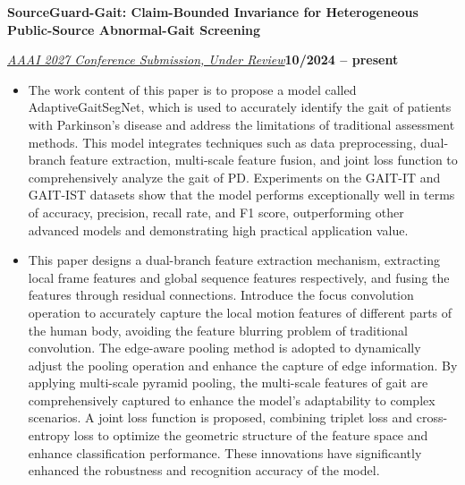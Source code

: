 \documentclass[10pt,a4paper]{article}
\newcommand{\titleline}[1]{\par\noindent\textbf{#1}\par}
\newcommand{\venueline}[2]{\par\noindent\uline{\textit{#1}}\hfill\textbf{#2}\par}
\newenvironment{cvitems}{%
  \begin{itemize}[leftmargin=14.20bp,labelwidth=4.20bp,labelsep=10.00bp,align=left,
    topsep=0bp,itemsep=0bp,parsep=0bp,partopsep=0bp,label={\textbullet}]
}{\end{itemize}}
\begin{document}
\titleline{SourceGuard-Gait: Claim-Bounded Invariance for Heterogeneous Public-Source Abnormal-Gait Screening}
\venueline{AAAI 2027 Conference Submission, Under Review}{10/2024 -- present}
\begin{cvitems}
\item The work content of this paper is to propose a model called AdaptiveGaitSegNet, which is used to accurately identify the gait of patients with Parkinson's disease and address the limitations of traditional assessment methods. This model integrates techniques such as data preprocessing, dual-branch feature extraction, multi-scale feature fusion, and joint loss function to comprehensively analyze the gait of PD. Experiments on the GAIT-IT and GAIT-IST datasets show that the model performs exceptionally well in terms of accuracy, precision, recall rate, and F1 score, outperforming other advanced models and demonstrating high practical application value.
\item This paper designs a dual-branch feature extraction mechanism, extracting local frame features and global sequence features respectively, and fusing the features through residual connections. Introduce the focus convolution operation to accurately capture the local motion features of different parts of the human body, avoiding the feature blurring problem of traditional convolution. The edge-aware pooling method is adopted to dynamically adjust the pooling operation and enhance the capture of edge information. By applying multi-scale pyramid pooling, the multi-scale features of gait are comprehensively captured to enhance the model's adaptability to complex scenarios. A joint loss function is proposed, combining triplet loss and cross-entropy loss to optimize the geometric structure of the feature space and enhance classification performance. These\newpage
innovations have significantly enhanced the robustness and recognition accuracy of the model.
\end{cvitems}
\end{document}
